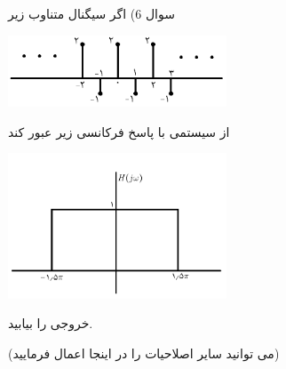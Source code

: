 \documentclass[50pt]{article}
\begin{document}
\begin{RTL}
{سوال 6) اگر سیگنال متناوب زیر

\begin{center}
\includegraphics[width=65mm]{m3}
\end{center}
از سیستمی با پاسخ فرکانسی زیر عبور کند
\begin{center}
\includegraphics[width=65mm]{m4}
\end{center}
خروجی را بیابید.




(می توانید سایر اصلاحیات را در اینجا اعمال فرمایید)









}





\end{RTL}
\end{document}
